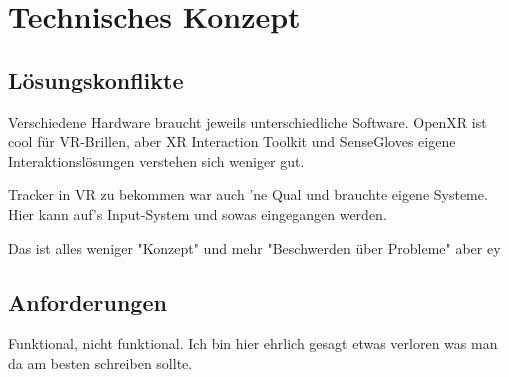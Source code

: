 \chapter{Technisches Konzept}

\section{Lösungskonflikte}
Verschiedene Hardware braucht jeweils unterschiedliche Software. OpenXR ist cool für VR-Brillen, aber XR Interaction Toolkit und SenseGloves eigene Interaktionslösungen verstehen sich weniger gut.

Tracker in VR zu bekommen war auch 'ne Qual und brauchte eigene Systeme. Hier kann auf's Input-System und sowas eingegangen werden.

Das ist alles weniger "Konzept" und mehr "Beschwerden über Probleme" aber ey

\section{Anforderungen}
Funktional, nicht funktional. Ich bin hier ehrlich gesagt etwas verloren was man da am besten schreiben sollte.